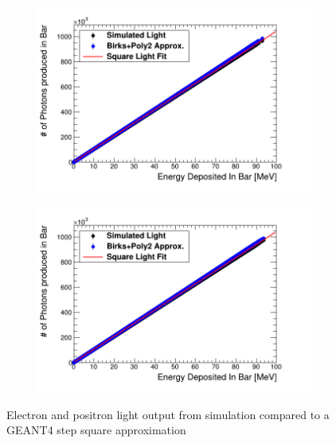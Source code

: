 \begin{figure}[!h]
\centering
\begin{subfigure}{.5\textwidth}
  \centering
  \includegraphics[width=\linewidth]{Chapter4/Figs/e-Birks-Poly2Slab_simAndApproxLight.png}
  \captionsetup{width=.9\linewidth}
  \caption{}
  \label{subFig:square_electron_light}
\end{subfigure}%
\begin{subfigure}{.5\textwidth}
  \centering
  \includegraphics[width=\linewidth]{Chapter4/Figs/e+Birks-Poly2Slab_simAndApproxLight.png}
  \captionsetup{width=.9\linewidth}
  \caption{}
  \label{subFig:square_positron_light}
\end{subfigure}
\caption{Electron and positron light output from simulation compared to a GEANT4 step square approximation}
\label{fig:square_electron_positron_light}
\end{figure}

